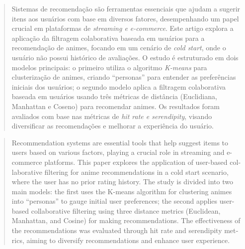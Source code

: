 \documentclass[twocolumn]{rbef}
\author[1]{Vinicius Valiati Costa}
\affil[1]{Aluno do programa de Especialização em Data Science \& Big Data, { vinivaliaticos@gmail.com}
}
\newcommand{\1}{\mathbbm{1}}
\begin{document}

\begin{primeirapagina}


  \begin{abstract}
Sistemas de recomendação são ferramentas essenciais que ajudam a sugerir itens aos usuários com base em diversos fatores, desempenhando um papel crucial em plataformas de \textit{streaming e e-commerce}. Este artigo explora a aplicação da filtragem colaborativa baseada em usuários para a recomendação de animes, focando em um cenário de \textit{cold start}, onde o usuário não possui histórico de avaliações. O estudo é estruturado em dois modelos principais: o primeiro utiliza o algoritmo \textit{K-means }para clusterização de animes, criando “personas” para entender as preferências iniciais dos usuários; o segundo modelo aplica a filtragem colaborativa baseada em usuários usando três métricas de distância (Euclidiana, Manhattan e Coseno) para recomendar animes. Os resultados foram avaliados com base nas métricas de \textit{hit rate e serendipity}, visando diversificar as recomendações e melhorar a experiência do usuário.


  \end{abstract}

  \begin{otherlanguage}{english}


    \begin{abstract}
Recommendation systems are essential tools that help suggest items to users based on various factors, playing a crucial role in streaming and e-commerce platforms. This paper explores the application of user-based collaborative filtering for anime recommendations in a cold start scenario, where the user has no prior rating history. The study is divided into two main models: the first uses the K-means algorithm for clustering animes into “personas” to gauge initial user preferences; the second applies user-based collaborative filtering using three distance metrics (Euclidean, Manhattan, and Cosine) for making recommendations. The effectiveness of the recommendations was evaluated through hit rate and serendipity metrics, aiming to diversify recommendations and enhance user experience.

    \end{abstract}
  \end{otherlanguage}

\end{primeirapagina}
\saythanks
\end{document}
